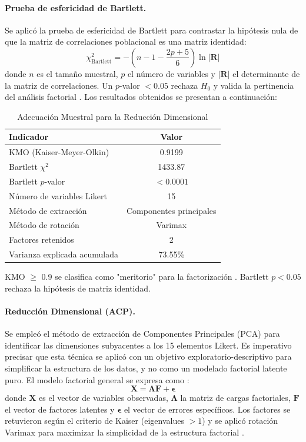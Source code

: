 \documentclass[11pt,a4paper]{article}
\begin{document}
\paragraph{Prueba de esfericidad de Bartlett.}
Se aplicó la prueba de esfericidad de Bartlett \citep{hair2019} para contrastar la hipótesis nula de que la matriz de correlaciones poblacional es una matriz identidad:
\begin{equation}
    \chi_{\text{Bartlett}}^{2} = - \left( n - 1 - \frac{2p + 5}{6} \right)\ln|\mathbf{R}|
\end{equation}
donde $n$ es el tamaño muestral, $p$ el número de variables y $|\mathbf{R}|$ el determinante de la matriz de correlaciones. Un $p$-valor $< 0.05$ rechaza $H_{0}$ y valida la pertinencia del análisis factorial \citep{hair2019}. Los resultados obtenidos se presentan a continuación:

\begin{table}[H]
\centering
\caption{Adecuaci\'on Muestral para la Reducci\'on Dimensional}
\begin{tabular}{@{}lc@{}}
\toprule
Indicador & Valor \\ \midrule
KMO (Kaiser-Meyer-Olkin) & 0.9199 \\
Bartlett $\chi^{2}$ & 1433.87 \\
Bartlett $p$-valor & $< 0.0001$ \\
Número de variables Likert & 15 \\
Método de extracción & Componentes principales \\
Método de rotación & Varimax \\
Factores retenidos & 2 \\
Varianza explicada acumulada & 73.55\% \\ \bottomrule
\end{tabular}
\par\smallskip
\footnotesize{KMO $\geq$ 0.9 se clasifica como "meritorio" para la factorización \citep{goretzko2021}. Bartlett $p < 0.05$ rechaza la hipótesis de matriz identidad.}
\end{table}

\paragraph{Reducción Dimensional (ACP).}
Se empleó el método de extracción de Componentes Principales (PCA) para identificar las dimensiones subyacentes a los 15 elementos Likert. Es imperativo precisar que esta técnica se aplicó con un objetivo exploratorio-descriptivo para simplificar la estructura de los datos, y no como un modelado factorial latente puro. El modelo factorial general se expresa como \citep{jolliffe2002}:
\begin{equation}
    \mathbf{X} = \mathbf{\Lambda}\mathbf{F} + \mathbf{\epsilon}
\end{equation}
donde $\mathbf{X}$ es el vector de variables observadas, $\mathbf{\Lambda}$ la matriz de cargas factoriales, $\mathbf{F}$ el vector de factores latentes y $\mathbf{\epsilon}$ el vector de errores específicos. Los factores se retuvieron según el criterio de Kaiser (eigenvalues $> 1$) y se aplicó rotación Varimax para maximizar la simplicidad de la estructura factorial \citep{hair2019}.
\end{document}
